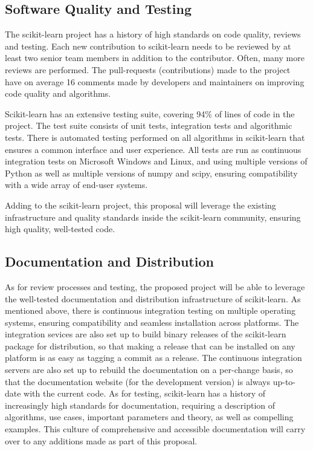 \subsection{Software Quality and Testing}
The scikit-learn project has a history of high standards on code quality, reviews and testing.
Each new contribution to scikit-learn needs to be reviewed by at least two senior team members
in addition to the contributor. Often, many more reviews are performed. The
pull-requests (contributions) made to the project have on average 16 comments
made by developers and maintainers on improving code quality and algorithms.

Scikit-learn has an extensive testing suite, covering 94\% of lines of code in the project.
The test suite consists of unit tests, integration tests and algorithmic tests.
There is automated testing performed on all algorithms in scikit-learn that ensures a common
interface and user experience.
All tests are run as continuous integration tests on Microsoft Windows and Linux, and using
multiple versions of Python as well as multiple versions of numpy and scipy, ensuring
compatibility with a wide array of end-user systems.

Adding to the scikit-learn project, this proposal will leverage the existing infrastructure
and quality standards inside the scikit-learn community, ensuring high quality, well-tested code.

\subsection{Documentation and Distribution}
As for review processes and testing, the proposed project will be able to leverage the
well-tested documentation and distribution infrastructure of scikit-learn.
As mentioned above, there is continuous integration testing on multiple operating systems,
ensuring compatibility and seamless installation across platforms.
The integration sevices are also set up to build binary releases of the scikit-learn package
for distribution, so that making a release that can be installed on any platform is as
easy as tagging a commit as a release.
The continuous integration servers are also set up to rebuild the documentation on a per-change
basis, so that the documentation website (for the development version) is always up-to-date
with the current code.
As for testing, scikit-learn has a history of increasingly high standards for documentation,
requiring a description of algorithms, use cases, important parameters and theory,
as well as compelling examples. This culture of comprehensive and accessible documentation
will carry over to any additions made as part of this proposal.

